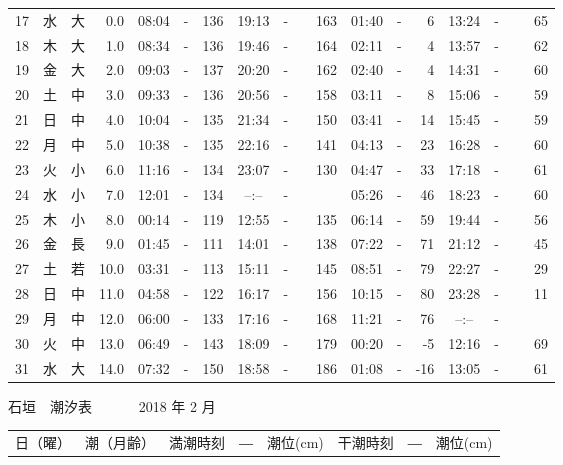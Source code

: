 \documentclass[12pt.a4j]{jsarticle}
\begin{document}
\begin{center}
\begin{table}[ht]
\begin{tabular}{|rc|cr|ccrccr|ccrccr|}
17 & 水 & 大 &  0.0 &  08:04 &-& 136  &  19:13 &-& 163  &   01:40 &-&   6  &   13:24 &-&  65  \\
18 & 木 & 大 &  1.0 &  08:34 &-& 136  &  19:46 &-& 164  &   02:11 &-&   4  &   13:57 &-&  62  \\
19 & 金 & 大 &  2.0 &  09:03 &-& 137  &  20:20 &-& 162  &   02:40 &-&   4  &   14:31 &-&  60  \\
20 & 土 & 中 &  3.0 &  09:33 &-& 136  &  20:56 &-& 158  &   03:11 &-&   8  &   15:06 &-&  59  \\
21 & 日 & 中 &  4.0 &  10:04 &-& 135  &  21:34 &-& 150  &   03:41 &-&  14  &   15:45 &-&  59  \\
22 & 月 & 中 &  5.0 &  10:38 &-& 135  &  22:16 &-& 141  &   04:13 &-&  23  &   16:28 &-&  60  \\
23 & 火 & 小 &  6.0 &  11:16 &-& 134  &  23:07 &-& 130  &   04:47 &-&  33  &   17:18 &-&  61  \\
24 & 水 & 小 &  7.0 &  12:01 &-& 134  &  --:-- &-&~~~~~ &   05:26 &-&  46  &   18:23 &-&  60  \\
25 & 木 & 小 &  8.0 &  00:14 &-& 119  &  12:55 &-& 135  &   06:14 &-&  59  &   19:44 &-&  56  \\
26 & 金 & 長 &  9.0 &  01:45 &-& 111  &  14:01 &-& 138  &   07:22 &-&  71  &   21:12 &-&  45  \\
27 & 土 & 若 & 10.0 &  03:31 &-& 113  &  15:11 &-& 145  &   08:51 &-&  79  &   22:27 &-&  29  \\
28 & 日 & 中 & 11.0 &  04:58 &-& 122  &  16:17 &-& 156  &   10:15 &-&  80  &   23:28 &-&  11  \\
29 & 月 & 中 & 12.0 &  06:00 &-& 133  &  17:16 &-& 168  &   11:21 &-&  76  &   --:-- &-&~~~~~ \\
30 & 火 & 中 & 13.0 &  06:49 &-& 143  &  18:09 &-& 179  &   00:20 &-&  -5  &   12:16 &-&  69  \\
31 & 水 & 大 & 14.0 &  07:32 &-& 150  &  18:58 &-& 186  &   01:08 &-& -16  &   13:05 &-&  61  \\
   \hline
   \end{tabular}
\end{table}
\newpage
 {\LARGE 石垣　潮汐表　　　}
 {\large 2018 年  2 月}\\
 \begin{table}[ht]
    \begin{tabular}{|rc|cr|ccrccr|ccrccr|}
    \hline
    \multicolumn{2}{|c|}{日（曜）} & \multicolumn{2}{c|}{潮（月齢）} & \multicolumn{6}{c|}{満潮時刻　―　潮位(cm)} & \multicolumn{6}{c|}{干潮時刻　―　潮位(cm)} \\

\end{tabular}
\end{table}
\end{center}
\end{document}
